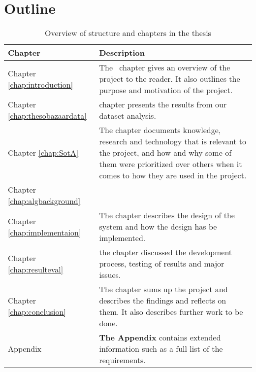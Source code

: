 \section{Outline}
\begin{table}[H]
  \centering
  \begin{tabular}{lp{11cm}}
  \toprule
    \textbf{Chapter}      & \textbf{Description} \\
  \midrule

    Chapter \ref{chap:introduction} & The~\nameref{chap:introduction} chapter gives an overview of the
    project to the reader. It also outlines the purpose and motivation of the
    project.  \\[1.5ex]

    Chapter \ref{chap:thesobazaardata} & \nameref{chap:thesobazaardata} chapter presents the results from our
    dataset analysis. \\[1.5ex]

    Chapter \ref{chap:SotA} & The \nameref{chap:SotA} chapter documents knowledge,
    research and technology that is relevant to the project, and how and why
    some of them were prioritized over others when it comes to how they are
    used in the project. \\[1.5ex]

    Chapter \ref{chap:algbackground} & \nameref{chap:algbackground} \\[1.5ex]

    Chapter \ref{chap:implementaion} & The \nameref{chap:implementaion} chapter describes the design of the
    system and how the design has be implemented. \\[1.5ex]

    Chapter \ref{chap:resulteval} & the \nameref{chap:resulteval} chapter discussed the development process,
    testing of results and major issues. \\[1.5ex]

    Chapter \ref{chap:conclusion} & The \nameref{chap:conclusion} chapter sums up the project and describes the
    findings and reflects on them. It also describes further work to be done.
    \\[1.5ex]

    Appendix & \textbf{The Appendix} contains extended information such as a full list of the requirements. \\

  \bottomrule
  \end{tabular}
  \caption{Overview of structure and chapters in the thesis}
  \label{table-reportstructure}
\end{table}
